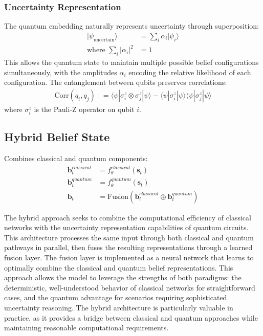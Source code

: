 \documentclass[11pt]{article}
\begin{document}
\subsubsection{Uncertainty Representation}
The quantum embedding naturally represents uncertainty through superposition:
\begin{align}
    |\psi_{\text{uncertain}}\rangle &= \sum_{i} \alpha_i |\psi_i\rangle \\
    \text{where } \sum_{i} |\alpha_i|^2 &= 1
\end{align}
This allows the quantum state to maintain multiple possible belief configurations simultaneously, with the amplitudes $\alpha_i$ encoding the relative likelihood of each configuration. The entanglement between qubits preserves correlations:
\begin{align}
    \text{Corr}(q_i, q_j) &= \langle \psi | \sigma_i^z \otimes \sigma_j^z | \psi \rangle - \langle \psi | \sigma_i^z | \psi \rangle \langle \psi | \sigma_j^z | \psi \rangle
\end{align}
where $\sigma_i^z$ is the Pauli-Z operator on qubit $i$.

\subsection{Hybrid Belief State}
Combines classical and quantum components:
\begin{align}
    \mathbf{b}_t^{classical} &= f_{\theta}^{classical}(\mathbf{s}_t) \\
    \mathbf{b}_t^{quantum} &= f_{\theta}^{quantum}(\mathbf{s}_t) \\
    \mathbf{b}_t &= \text{Fusion}(\mathbf{b}_t^{classical} \oplus \mathbf{b}_t^{quantum})
\end{align}

The hybrid approach seeks to combine the computational efficiency of classical networks with the uncertainty representation capabilities of quantum circuits. This architecture processes the same input through both classical and quantum pathways in parallel, then fuses the resulting representations through a learned fusion layer. The fusion layer is implemented as a neural network that learns to optimally combine the classical and quantum belief representations. This approach allows the model to leverage the strengths of both paradigms: the deterministic, well-understood behavior of classical networks for straightforward cases, and the quantum advantage for scenarios requiring sophisticated uncertainty reasoning. The hybrid architecture is particularly valuable in practice, as it provides a bridge between classical and quantum approaches while maintaining reasonable computational requirements.
\end{document}
